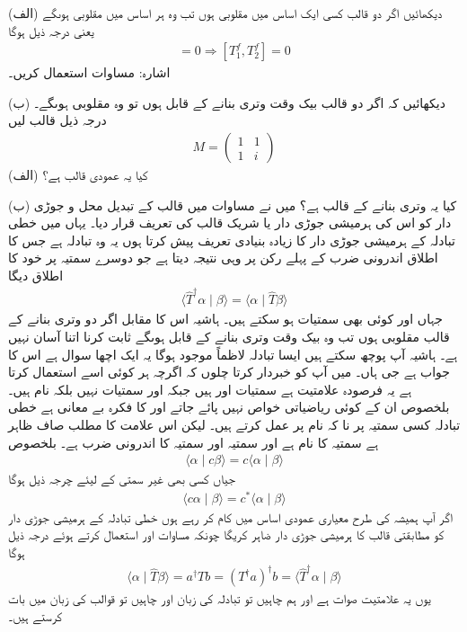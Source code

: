 (الف) دیکھائیں اگر دو قالب کسی ایک اساس میں مقلوبی ہوں تب وہ ہر اساس میں مقلوبی ہوںگے یعنی درجہ ذیل ہوگا
\begin{align}
	[T^e_1, T^e_2] = 0 \Rightarrow [T^f_1, T^f_2] = 0
\end{align}
اشارہ: مساوات  استعمال کریں۔

(ب) دیکھائیں کہ اگر دو قالب بیک وقت وتری بنانے کے قابل ہوں تو وہ مقلوبی ہوںگے۔
درجہ ذیل قالب لیں
\begin{align*}
	M=
	\begin{pmatrix}
		1 & 1\\
		1 & i
	\end{pmatrix}
\end{align*}
(الف) کیا یہ عمودی قالب ہے؟

(ب) کیا یہ وتری بنانے کے قالب ہے؟
میں نے مساوات  میں قالب کے تبدیل محل و جوڑی دار  کو اس کی ہرمیشی جوڑی دار یا شریک قالب کی تعریف قرار دیا۔ یہاں میں خطی تبادلہ کے ہرمیشی جوڑی دار کا زیادہ بنیادی تعریف پیش کرتا ہوں یہ وہ تبادلہ  ہے جس کا اطلاق اندرونی ضرب کے پہلے رکن پر وہی نتیجہ دیتا ہے جو دوسرے سمتیہ پر خود  کا اطلاق دیگا
\begin{align}
	\langle\hat{T}^{\dagger}\alpha\mid\beta\rangle = \langle\alpha\mid\hat{T}\beta\rangle
\end{align}
جہاں  اور  کوئی بھی سمتیات ہو سکتے ہیں۔ ہاشیہ اس کا مقابل اگر دو وتری بنانے کے قالب مقلوبی ہوں تب وہ بیک وقت وتری بنانے کے قابل ہوںگے ثابت کرنا اتنا آسان نہیں ہے۔ ہاشیہ آپ پوچھ سکتے ہیں ایسا تبادلہ لاظماً موجود ہوگا یہ ایک اچھا سوال ہے اس کا جواب ہے جی ہاں۔ میں آپ کو خبردار کرتا چلوں کہ اگرچہ ہر کوئی اسے استعمال کرتا ہے یہ فرصودہ علامتیت ہے سمتیات  اور  ہیں جبکہ  اور  سمتیات نہیں بلکہ نام ہیں۔ بلخصوص ان کے کوئی ریاضیاتی خواص نہیں پائے جاتے اور  کا فکرہ بے معانی ہے خطی تبادلہ کسی سمتیہ پر نا کہ نام پر عمل کرتے ہیں۔ لیکن اس علامت کا مطلب صاف ظاہر ہے سمتیہ  کا نام  ہے اور سمتیہ  اور سمتیہ  کا اندرونی ضرب  ہے۔ بلخصوص
\begin{align}
	\langle\alpha\mid c\beta\rangle = c\langle\alpha\mid\beta\rangle
\end{align}
جیاں کسی بھی غیر سمتی  کے لیئے چرجہ ذیل ہوگا
\begin{align}
	\langle c\alpha\mid\beta\rangle = c^{*}\langle\alpha\mid\beta\rangle
\end{align}
اگر آپ ہمیشہ کی طرح معیاری عمودی اساس میں کام کر رہے ہوں خطی تبادلہ کے ہرمیشی جوڑی دار کو مطابقتی قالب کا ہرمیشی جوڑی دار ضاہر کریگا چونکہ مساوات  اور  استعمال کرتے ہوئے درجہ ذیل ہوگا
\begin{align}
	\langle\alpha\mid\hat{T}\beta\rangle = a^\dagger Tb = (T^\dagger a)^\dagger b = \langle\hat{T}^\dagger\alpha\mid\beta\rangle
\end{align}
یوں یہ علامتیت صوات ہے اور ہم چاہیں تو تبادلہ کی زبان اور چاہیں تو قوالب کی زبان میں بات کرستے ہیں۔

